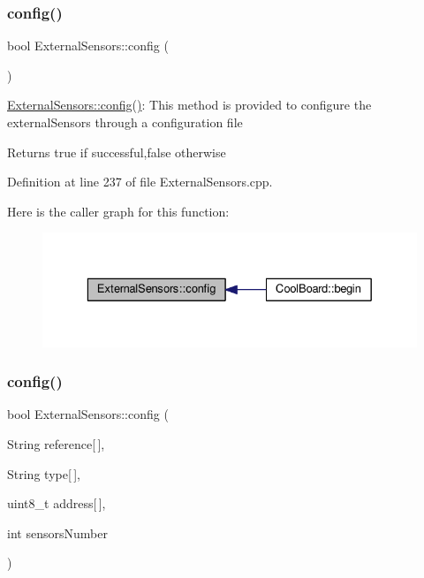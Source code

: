 \subsubsection{\texorpdfstring{config()}{config()}\hspace{0.1cm}{\footnotesize\ttfamily [1/2]}}
{\footnotesize\ttfamily bool External\+Sensors\+::config (\begin{DoxyParamCaption}{ }\end{DoxyParamCaption})}

\hyperlink{class_external_sensors_a862a4bd11346b37270d0244c2adabe5a}{External\+Sensors\+::config()}\+: This method is provided to configure the external\+Sensors through a configuration file

\begin{DoxyReturn}{Returns}
true if successful,false otherwise 
\end{DoxyReturn}


Definition at line 237 of file External\+Sensors.\+cpp.

Here is the caller graph for this function\+:
\nopagebreak
\begin{figure}[H]
\begin{center}
\leavevmode
\includegraphics[width=329pt]{class_external_sensors_a862a4bd11346b37270d0244c2adabe5a_icgraph}
\end{center}
\end{figure}
\mbox{\label{class_external_sensors_ac829858f587e15a3fcb00567248f0edd}} 
\subsubsection{\texorpdfstring{config()}{config()}\hspace{0.1cm}{\footnotesize\ttfamily [2/2]}}
{\footnotesize\ttfamily bool External\+Sensors\+::config (\begin{DoxyParamCaption}\item[{String}]{reference\mbox{[}$\,$\mbox{]},  }\item[{String}]{type\mbox{[}$\,$\mbox{]},  }\item[{uint8\+\_\+t}]{address\mbox{[}$\,$\mbox{]},  }\item[{int}]{sensors\+Number }\end{DoxyParamCaption})}

